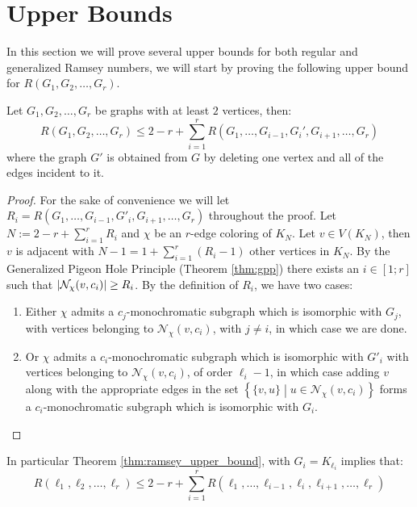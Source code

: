 \section{Upper Bounds}\label{sec:upper_bound}
In this section we will prove several upper bounds for both regular and generalized Ramsey numbers, we will start by proving the following upper bound for $R(G_1, G_2, \ldots, G_{r})$.
\begin{theorem}\label{thm:ramsey_upper_bound}
	Let $G_1, G_2, \ldots, G_r$ be graphs with at least $2$ vertices, then:
	\begin{equation*}
		R(G_{1}, G_2, \ldots, G_{r}) \leq 2 - r + \sum_{i = 1}^r R(G_1, \ldots, G_{i - 1}, G_{i}', G_{i + 1}, \ldots, G_{r})
	\end{equation*}
	where the graph $G'$ is obtained from $G$ by deleting one vertex and all of the edges incident to it.
\end{theorem}
\begin{proof}
	For the sake of convenience we will let $R_i = R(G_1, \ldots, G_{i - 1}, G'_{i}, G_{i + 1}, \ldots, G_{r})$ throughout the proof.
	Let $N := 2 - r + \sum_{i = 1}^r R_{i}$ and $\chi$ be an $r$-edge coloring of $K_N$.
	Let $v \in V(K_{N})$, then $v$ is adjacent with $N - 1 = 1 +\sum_{i = 1}^r \left(R_{i} - 1\right)$ other vertices in $K_N$.
	By the Generalized Pigeon Hole Principle (Theorem \ref{thm:gpp}) there exists an $i \in [1; r]$ such that $\left\lvert\mathcal{N}_{\chi}(v, c_i)\right\rvert \geq R_{i}$.
	By the definition of $R_i$, we have two cases:
	\begin{enumerate}
		\item Either $\chi$ admits a $c_j$-monochromatic subgraph which is isomorphic with $G_j$, with vertices belonging to $\mathcal{N}_{\chi}(v, c_{i})$, with $j \neq i$, in which case we are done.
		\item Or $\chi$ admits a $c_i$-monochromatic subgraph which is isomorphic with $G'_{i}$ with vertices belonging to $\mathcal{N}_{\chi}(v, c_i)$, of order $\ell_i - 1$, in which case adding $v$ along with the appropriate edges in the set $\left\{\{v, u\} \middle| u \in \mathcal{N}_{\chi}(v, c_{i})\right\}$ forms a $c_i$-monochromatic subgraph which is isomorphic with $G_{i}$. \qedhere
	\end{enumerate}
\end{proof}

In particular Theorem \ref{thm:ramsey_upper_bound}, with $G_i = K_{\ell_{i}}$ implies that:
\begin{equation}\label{eq:cor_1}
	R \left(\ell_1, \ell_2, \ldots, \ell_{r}\right) \leq 2 - r +  \sum_{i = 1}^r R(\ell_1, \ldots, \ell_{i - 1}, \ell_i, \ell_{i + 1}, \ldots, \ell_{r})
\end{equation}

